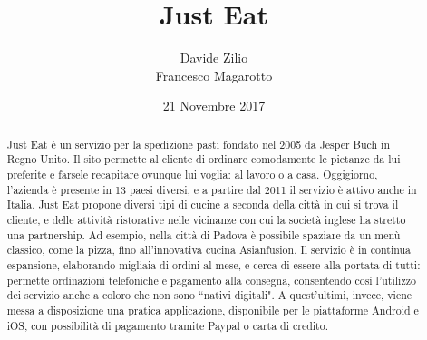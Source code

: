 \documentclass[10pt]{article}
\title{Just Eat}
\author{Davide Zilio\\Francesco Magarotto}
\date{21 Novembre 2017}
\begin{document}
	\maketitle
	\begin{LARGE}
	\begin{abstract}
	\begin{linenumbers}
	Just Eat \`e un servizio per la spedizione pasti fondato nel 2005 da Jesper Buch in Regno Unito. Il sito permette al cliente di ordinare comodamente le pietanze da lui preferite e farsele recapitare ovunque lui voglia: al lavoro o a casa. 
	Oggigiorno, l'azienda \`e presente in 13 paesi diversi, e a partire dal 2011 il servizio \`e  attivo anche in Italia. Just Eat propone diversi tipi di cucine a seconda della citt\`a in cui si trova il cliente, e delle attivit\`a ristorative nelle vicinanze con cui la società inglese ha stretto una partnership. Ad esempio, nella citt\`a di Padova \`e possibile spaziare da un men\`u classico, come la pizza, fino all'innovativa cucina Asianfusion. Il servizio \`e in continua espansione, elaborando migliaia di ordini al mese, e cerca di essere alla portata di tutti: permette ordinazioni telefoniche e pagamento alla consegna, consentendo cos\`i l'utilizzo dei servizio anche a coloro che non sono ``nativi digitali". A quest'ultimi, invece, viene messa a disposizione una pratica applicazione, disponibile per le piattaforme Android\texttrademark{} e iOS\texttrademark{}, con possibilit\`a di pagamento tramite Paypal\texttrademark{}  o carta di credito. 
	\end{linenumbers}
	\end{abstract}
	\end{LARGE}
	\pagebreak
	\tableofcontents{}
	\pagebreak
\end{document}
